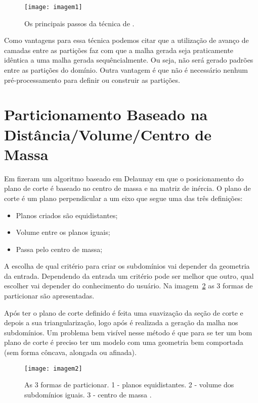  \begin{figure}[htbp]
     \centering
     \texttt{[image: imagem1]}
     \caption{Os principais passos da técnica de \citet{bib:Pirzadeh09}.}
     \label{fig:imagem1}
 \end{figure}
 
 Como vantagens para essa técnica podemos citar que a utilização de avanço de camadas entre as partições faz com que a malha gerada seja praticamente idêntica a uma malha gerada sequêncialmente. Ou seja, não será gerado padrões entre as partições do domínio. Outra vantagem é que não é necessário nenhum pré-processamento para definir ou construir as partições.

\section{Particionamento Baseado na Distância/Volume/Centro de Massa}
 
Em \citet{bib:Ivanov06} fizeram um algoritmo baseado em Delaunay em que o posicionamento do plano de corte é baseado no centro de massa e na matriz de inércia. O plano de corte é um plano perpendicular a um eixo que segue uma das três definições:

\begin{itemize}
  \item Planos criados são equidistantes;

  \item Volume entre os planos iguais;

  \item Passa pelo centro de massa;
\end{itemize}

A escolha de qual critério para criar os subdomínios vai depender da geometria da entrada. Dependendo da entrada um critério pode ser melhor que outro, qual escolher vai depender do conhecimento do usuário. Na imagem~\ref{fig:imagem2} as 3 formas de particionar são apresentadas.

Após ter o plano de corte definido é feita uma suavização da seção de corte e depois a sua triangularização, logo após é realizada a geração da malha nos subdomínios. Um problema bem visível nesse método é que para se ter um bom plano de corte é preciso ter um modelo com uma geometria bem comportada (sem forma côncava, alongada ou afinada).

 \begin{figure}[htbp]
     \centering
     \texttt{[image: imagem2]}
     \caption{As 3 formas de particionar. 1 - planos equidistantes. 2 - volume dos subdomínios iguais. 3 - centro de massa \citet{bib:Ivanov06}.}
     \label{fig:imagem2}
 \end{figure}

